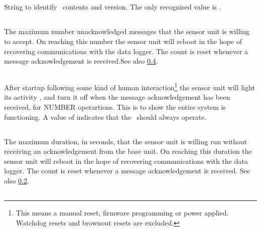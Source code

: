 \subsection[magic]{}

String to identify \eeprom\ contents and version. The only recognised value is
.

\subsection[max-message-no-ack]{}
\label{sec:eeprom-max-message-no-ack}
The maximum number unacknowledged messages that the sensor unit is
willing to accept. On reaching this number the sensor unit will reboot
in the hope of recovering communications with the data logger. The
count is reset whenever a message acknowledgement is received.See also
\ref{sec:eeprom-max-time-no-ack}.

\subsection[max-messages-led]{}

After startup following some kind of human interaction\footnote{This
  means a manual reset, firmware programming or power
  applied. Watchdog resets and brownout resets are excluded.} the
sensor unit will light its activity \led, and turn it off when the
message acknowledgement has been received, for NUMBER
operartions. This is to show the entire system is functioning. A value
of  indicates that the \led\ should always
operate. 

\subsection[max-time-no-ack]{}
\label{sec:eeprom-max-time-no-ack}
The maximum duration, in seconds, that the sensor unit is willing run
without receiving an acknowledgement from the base unit. On reaching
this duration the sensor unit will reboot in the hope of recovering
communications with the data logger. The count is reset whenever a
message acknowledgement is received. See also
\ref{sec:eeprom-max-message-no-ack}.


\subsection[mcp7941x-cal]{}


